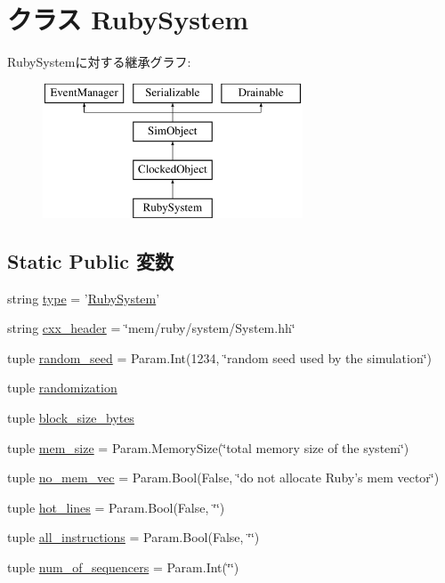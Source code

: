 \hypertarget{classRubySystem_1_1RubySystem}{
\section{クラス RubySystem}
\label{classRubySystem_1_1RubySystem}
}
RubySystemに対する継承グラフ:\begin{figure}[H]
\begin{center}
\leavevmode
\includegraphics[height=4cm]{classRubySystem_1_1RubySystem}
\end{center}
\end{figure}
\subsection*{Static Public 変数}
\begin{DoxyCompactItemize}
\item 
string \hyperlink{classRubySystem_1_1RubySystem_acce15679d830831b0bbe8ebc2a60b2ca}{type} = '\hyperlink{classRubySystem_1_1RubySystem}{RubySystem}'
\item 
string \hyperlink{classRubySystem_1_1RubySystem_a17da7064bc5c518791f0c891eff05fda}{cxx\_\-header} = \char`\"{}mem/ruby/system/System.hh\char`\"{}
\item 
tuple \hyperlink{classRubySystem_1_1RubySystem_acf19a71d62a3b6e155d68d47a18e7df5}{random\_\-seed} = Param.Int(1234, \char`\"{}random seed used by the simulation\char`\"{})
\item 
tuple \hyperlink{classRubySystem_1_1RubySystem_a58cb283ff2d96c6de2c91d47c5baed68}{randomization}
\item 
tuple \hyperlink{classRubySystem_1_1RubySystem_a9fa848964cfebde5e57a1068aaf0a876}{block\_\-size\_\-bytes}
\item 
tuple \hyperlink{classRubySystem_1_1RubySystem_a06f484e37e051960e829755013a60b16}{mem\_\-size} = Param.MemorySize(\char`\"{}total memory size of the system\char`\"{})
\item 
tuple \hyperlink{classRubySystem_1_1RubySystem_a3054467f348a319c6456cfb441f1e10c}{no\_\-mem\_\-vec} = Param.Bool(False, \char`\"{}do not allocate Ruby's mem vector\char`\"{})
\item 
tuple \hyperlink{classRubySystem_1_1RubySystem_a27213f0449c5af2ea4c6a1f2c8473f4c}{hot\_\-lines} = Param.Bool(False, \char`\"{}\char`\"{})
\item 
tuple \hyperlink{classRubySystem_1_1RubySystem_ae13711b8d6db1becb2c7b42b2bd65528}{all\_\-instructions} = Param.Bool(False, \char`\"{}\char`\"{})
\item 
tuple \hyperlink{classRubySystem_1_1RubySystem_af8a467f812c4e782637454bb5b504cc9}{num\_\-of\_\-sequencers} = Param.Int(\char`\"{}\char`\"{})
\end{DoxyCompactItemize}


